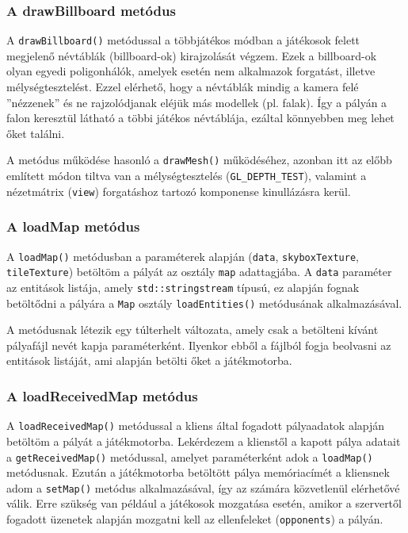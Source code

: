 \subsubsection{A drawBillboard metódus}

A \verb|drawBillboard()| metódussal a többjátékos módban a játékosok felett megjelenő névtáblák (billboard-ok) kirajzolását végzem. Ezek a billboard-ok olyan egyedi poligonhálók, amelyek esetén nem alkalmazok forgatást, illetve mélységtesztelést. Ezzel elérhető, hogy a névtáblák mindig a kamera felé ''nézzenek'' és ne rajzolódjanak eléjük más modellek (pl. falak). Így a pályán a falon keresztül látható a többi játékos névtáblája, ezáltal könnyebben meg lehet őket találni.

A metódus működése hasonló a \verb|drawMesh()| működéséhez, azonban itt az előbb említett módon tiltva van a mélységtesztelés (\verb|GL_DEPTH_TEST|), valamint a nézetmátrix (\verb|view|) forgatáshoz tartozó komponense kinullázásra kerül.

\subsubsection{A loadMap metódus}

A \verb|loadMap()| metódusban a paraméterek alapján (\verb|data|, \verb|skyboxTexture|, \verb|tileTexture|) betöltöm a pályát az osztály \verb|map| adattagjába. A \verb|data| paraméter az entitások listája, amely \verb|std::stringstream| típusú, ez alapján fognak betöltődni a pályára a \verb|Map| osztály \verb|loadEntities()| metódusának alkalmazásával.

A metódusnak létezik egy túlterhelt változata, amely csak a betölteni kívánt pályafájl nevét kapja paraméterként. Ilyenkor ebből a fájlból fogja beolvasni az entitások listáját, ami alapján betölti őket a játékmotorba.

\subsubsection{A loadReceivedMap metódus}

A \verb|loadReceivedMap()| metódussal a kliens által fogadott pályaadatok alapján betöltöm a pályát a játékmotorba. Lekérdezem a klienstől a kapott pálya adatait a \verb|getReceivedMap()| metódussal, amelyet paraméterként adok a \verb|loadMap()| metódusnak. Ezután a játékmotorba betöltött pálya memóriacímét a kliensnek adom a \verb|setMap()| metódus alkalmazásával, így az számára közvetlenül elérhetővé válik. Erre szükség van például a játékosok mozgatása esetén, amikor a szervertől fogadott üzenetek alapján mozgatni kell az ellenfeleket (\verb|opponents|) a pályán.

